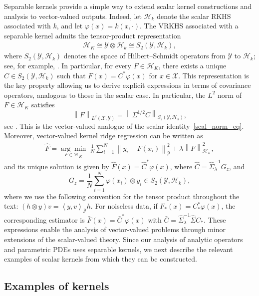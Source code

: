 \documentclass[11pt]{article}
\numberwithin{equation}{section}
\theoremstyle{plain}
\theoremstyle{definition}
\theoremstyle{remark}
\newcommand{\X}{\mathcal{X}}
\newcommand{\Hs}{\mathcal{H}}
\newcommand{\Y}{\mathcal{Y}}
\newcommand{\norm}[1]{\left\lVert#1\right\rVert}
\newcommand{\innerpro}[1]{\left\langle#1\right\rangle}
\begin{document}
Separable kernels provide a simple way to extend scalar kernel constructions and analysis to
vector-valued outputs. Indeed, let $\Hs_k$ denote the scalar RKHS associated
with $k$, and let $\varphi(x)=k(x,\cdot)$. The VRKHS associated with a
separable kernel admits the tensor-product representation
\begin{align}\label{eq:sep_isom}
\Hs_K
\cong
\Y\otimes\Hs_k
\cong
S_2(\Y,\Hs_k),
\end{align}
where $S_2(\Y,\Hs_k)$ denotes the space of Hilbert--Schmidt operators from $\Y$ to $\Hs_k$; see, for example,
\cite[Theorem~12.6.1]{aubin2011applied}.
In particular, for every $F\in\Hs_K$, there exists a unique
$C\in S_2(\Y,\Hs_k)$ such that
$F(x)=C^*\varphi(x)$ for $x\in\X$.
This representation is the key property allowing us to derive explicit
expressions in terms of covariance operators, analogous to those in the
scalar case. In particular, the $L^2$ norm of $F\in\Hs_K$ satisfies
\begin{equation}\label{vec_norm_eq}
\norm{F}_{L^2(\X,\Y)}
=
\norm{\Sigma^{1/2}C}_{S_2(\Y,\Hs_k)},
\end{equation}
see \cite[Lemma~2]{meunier2024optimal}. This is the vector-valued analogue
of the scalar identity~\eqref{scal_norm_eq}. Moreover, vector-valued kernel
ridge regression can be written as
\begin{align}\label{vec_krr}
\hat{F}
=
\underset{F\in\Hs_K}{\arg\min}\;
\frac{1}{N}\sum_{i=1}^N
\norm{y_i-F(x_i)}_{\Y}^2
+\lambda\norm{F}_{\Hs_K}^2,
\end{align}
and its unique solution is given by
$\hat{F}(x)=\hat{C}^*\varphi(x)$, where
$\hat{C}=\hat{\Sigma}_{\lambda}^{-1}G_z$,
and
\[
G_z
=
\frac{1}{N}\sum_{i=1}^N
\varphi(x_i)\otimes y_i
\in S_2(\Y,\Hs_k),
\]
where we use the following convention for the tensor product throughout the text:
$(h\otimes y)v=\innerpro{y,v}_{\Y}h$.
For noiseless data, if $F_*(x)=C_*^*\varphi(x)$, the corresponding estimator
is $\bar{F}(x)=\bar{C}^*\varphi(x)$ with
$\bar{C}=\hat{\Sigma}_{\lambda}^{-1}\hat{\Sigma}C_*$.
These expressions enable the analysis of vector-valued problems through minor
extensions of the scalar-valued theory. Since our analysis of analytic operators and parametric PDEs uses separable
kernels, we next describe the relevant examples of scalar kernels from which
they can be constructed.

\subsection{Examples of kernels}
\end{document}
